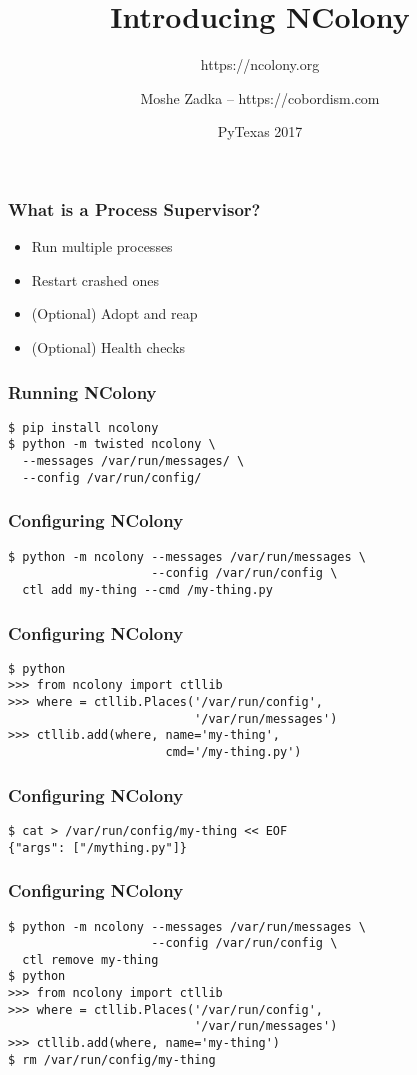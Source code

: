 \documentclass{beamer}
\title{Introducing NColony}
\subtitle{https://ncolony.org}
\author{Moshe Zadka -- https://cobordism.com}
\date{PyTexas 2017}
\begin{document}
 
\frame{\titlepage}

\begin{frame}
\frametitle{What is a Process Supervisor?}
\begin{itemize}
\item Run multiple processes \pause
\item Restart crashed ones \pause
\item (Optional) Adopt and reap \pause
\item (Optional) Health checks
\end{itemize}
\end{frame}

\begin{frame}[fragile]
\frametitle{Running NColony}
\begin{lstlisting}
$ pip install ncolony
$ python -m twisted ncolony \
  --messages /var/run/messages/ \
  --config /var/run/config/
\end{lstlisting}
\end{frame}

\begin{frame}[fragile]
\frametitle{Configuring NColony}
\begin{lstlisting}
$ python -m ncolony --messages /var/run/messages \
                    --config /var/run/config \
  ctl add my-thing --cmd /my-thing.py
\end{lstlisting}
\end{frame}

\begin{frame}[fragile]
\frametitle{Configuring NColony}
\begin{lstlisting}
$ python
>>> from ncolony import ctllib
>>> where = ctllib.Places('/var/run/config',
                          '/var/run/messages')
>>> ctllib.add(where, name='my-thing',
                      cmd='/my-thing.py')
\end{lstlisting}
\end{frame}

\begin{frame}[fragile]
\frametitle{Configuring NColony}
\begin{lstlisting}
$ cat > /var/run/config/my-thing << EOF
{"args": ["/mything.py"]}
\end{lstlisting}
\end{frame}

\begin{frame}[fragile]
\frametitle{Configuring NColony}
\begin{lstlisting}
$ python -m ncolony --messages /var/run/messages \
                    --config /var/run/config \
  ctl remove my-thing
$ python
>>> from ncolony import ctllib
>>> where = ctllib.Places('/var/run/config',
                          '/var/run/messages')
>>> ctllib.add(where, name='my-thing')
$ rm /var/run/config/my-thing
\end{lstlisting}
\end{frame}
\end{document}
